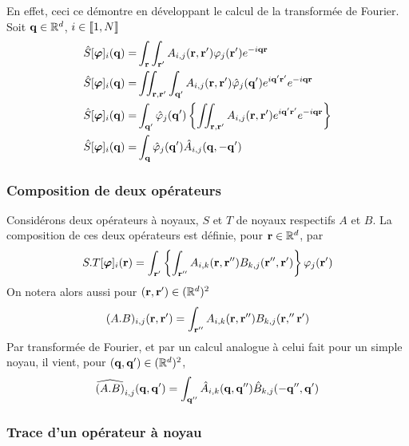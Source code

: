 \documentclass[10pt]{article}
\begin{document}
\begin{multicols}{2}
{\footnotesize
\noindent
En effet, ceci ce démontre en développant le calcul de la transformée de Fourier. Soit ${\bf q} \in \mathbb{R}^d$, $i \in  \llbracket 1,N \rrbracket $
\begin{align}
 \hat{S}[\boldsymbol{ \varphi}]_i({\bf q})  = & \int_{{\bf r}} \int_{{\bf r}'} A_{i,j}({\bf r},{\bf r}')\varphi_j({\bf r}') e^{-i{\bf q}{\bf r}}  \\
\hat{S}[\boldsymbol{ \varphi}]_i({\bf q})  = & \iint_{{\bf r}, {\bf r}'} \int_{{\bf q}'} A_{i,j}({\bf r},{\bf r}') \hat{\varphi}_j({\bf q}') e^{i{\bf q}'{\bf r}'} e^{- i{\bf q}{\bf r}} \\
 \hat{S}[\boldsymbol{ \varphi}]_i({\bf q})  = &   \int_{{\bf q}'} \hat{\varphi}_j({\bf q}') \left\{ \iint_{{\bf r}, {\bf r}'} A_{i,j}({\bf r},{\bf r}')  e^{i{\bf q}'{\bf r}'} e^{- i{\bf q}{\bf r}}  \right\}  \\
\hat{S}[\boldsymbol{ \varphi}]_i({\bf q}) = & \int_{{\bf q}}  \hat{\varphi}_j({\bf q}') \hat{A}_{i,j}({\bf q}, -{\bf q}')
\end{align}
}

\vspace*{11pt}

\subsubsection{Composition de deux opérateurs}

Considérons deux opérateurs à noyaux, $S$ et $T$ de noyaux respectifs $A$ et $B$. La composition de ces deux opérateurs est définie, pour ${\bf r} \in \mathbb{R}^d$, par
\begin{equation}
 	S . T [\boldsymbol{ \varphi}]_i ({\bf r}) = \int_{{\bf r}'}  \left\{ \int_{{\bf r}''} A_{i,k}({\bf r}, {\bf r}'')B_{k,j}({\bf r}'', {\bf r}') \right\} \varphi_j({\bf r}')
\end{equation}
On notera alors aussi pour $({\bf r}, {\bf r}') \in (\mathbb{R}^d)^2 $
\begin{equation}
   (A . B)_{i,j} ({\bf r}, {\bf r}') = \int_{{\bf r}''} A_{i,k}({\bf r}, {\bf r}'')B_{k,j}({\bf r},'' {\bf r}') 
\end{equation}
Par transformée de Fourier, et par un calcul analogue à celui fait pour un simple noyau, il vient, pour $({\bf q}, {\bf q}') \in (\mathbb{R}^d)^2$,
\begin{equation}
	\widehat{(A . B)}_{i,j}({\bf q}, {\bf q}') =\int_{{\bf q}''} \hat{A}_{i,k}({\bf q}, {\bf q}'')\hat{B}_{k,j}(-{\bf q}'', {\bf q}') 
\end{equation}



\vspace*{11pt}

\subsubsection{Trace d'un opérateur à noyau}


\end{multicols}
\end{document}
